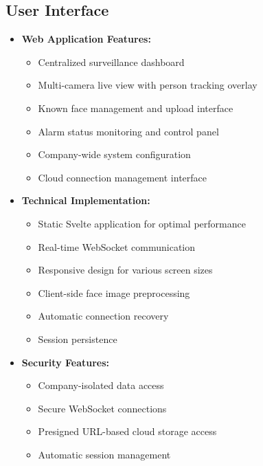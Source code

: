 \documentclass[conference]{IEEEtran}
\begin{document}
\subsection{User Interface}
\begin{itemize}
      \item \textbf{Web Application Features:}
            \begin{itemize}
                  \item Centralized surveillance dashboard
                  \item Multi-camera live view with person tracking overlay
                  \item Known face management and upload interface
                  \item Alarm status monitoring and control panel
                  \item Company-wide system configuration
                  \item Cloud connection management interface
            \end{itemize}
      
      \item \textbf{Technical Implementation:} 
            \begin{itemize}
                  \item Static Svelte application for optimal performance
                  \item Real-time WebSocket communication
                  \item Responsive design for various screen sizes
                  \item Client-side face image preprocessing
                  \item Automatic connection recovery
                  \item Session persistence
            \end{itemize}

      \item \textbf{Security Features:} 
            \begin{itemize}
                  \item Company-isolated data access
                  \item Secure WebSocket connections
                  \item Presigned URL-based cloud storage access
                  \item Automatic session management
            \end{itemize}
\end{itemize}
\end{document}
